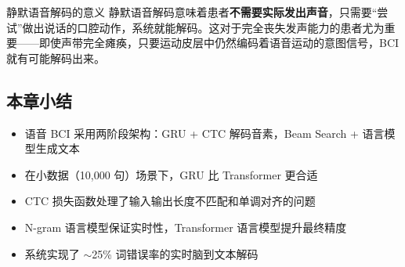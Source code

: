 \begin{knowledgebox}{静默语音解码的意义}
静默语音解码意味着患者\textbf{不需要实际发出声音}，只需要``尝试''做出说话的口腔动作，系统就能解码。这对于完全丧失发声能力的患者尤为重要——即使声带完全瘫痪，只要运动皮层中仍然编码着语音运动的意图信号，BCI 就有可能解码出来。
\end{knowledgebox}

\subsection{本章小结}

\begin{itemize}
    \item 语音 BCI 采用两阶段架构：GRU + CTC 解码音素，Beam Search + 语言模型生成文本
    \item 在小数据（10,000 句）场景下，GRU 比 Transformer 更合适
    \item CTC 损失函数处理了输入输出长度不匹配和单调对齐的问题
    \item N-gram 语言模型保证实时性，Transformer 语言模型提升最终精度
    \item 系统实现了 $\sim$25\% 词错误率的实时脑到文本解码
\end{itemize}


